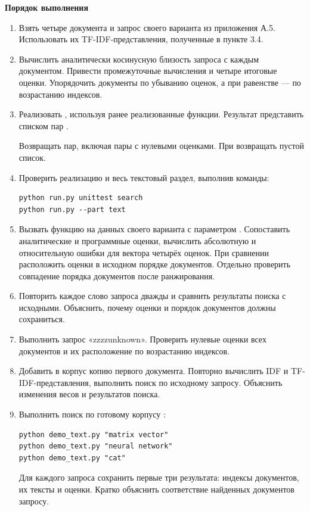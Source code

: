\documentclass[12pt,a4paper]{article}
\newcommand{\taskhead}[1]{\par\textbf{#1}\par}
\begin{document}
\taskhead{Порядок выполнения}
\begin{enumerate}
  \item Взять четыре документа и запрос своего варианта
  из приложения А.5. Использовать их TF-IDF-представления,
  полученные в пункте 3.4.
  \item Вычислить аналитически косинусную близость
  запроса с каждым документом. Привести промежуточные
  вычисления и четыре итоговые оценки.
  Упорядочить документы по убыванию оценок,
  а при равенстве --- по возрастанию индексов.
  \item Реализовать ,
  используя ранее реализованные функции.
  Результат представить списком пар .

  Возвращать  пар, включая пары
  с нулевыми оценками. При 
  возвращать пустой список.
  \item Проверить реализацию и весь текстовый раздел,
  выполнив команды:
  \begin{lstlisting}[style=commands]
python run.py unittest search
python run.py --part text\end{lstlisting}
  \item Вызвать функцию на данных своего варианта
  с параметром .
  Сопоставить аналитические и программные оценки,
  вычислить абсолютную и относительную ошибки
  для вектора четырёх оценок.
  При сравнении расположить оценки в исходном порядке
  документов. Отдельно проверить совпадение
  порядка документов после ранжирования.
  \item Повторить каждое слово запроса дважды
  и сравнить результаты поиска с исходными.
  Объяснить, почему оценки и порядок документов
  должны сохраниться.
  \item Выполнить запрос «zzzzunknown».
  Проверить нулевые оценки всех документов
  и их расположение по возрастанию индексов.
  \item Добавить в корпус копию первого документа.
  Повторно вычислить IDF и TF-IDF-представления,
  выполнить поиск по исходному запросу.
  Объяснить изменения весов и результатов поиска.
  \item Выполнить поиск по готовому корпусу
  :
  \begin{lstlisting}[style=commands]
python demo_text.py "matrix vector"
python demo_text.py "neural network"
python demo_text.py "cat"\end{lstlisting}
  Для каждого запроса сохранить первые три результата:
  индексы документов, их тексты и оценки.
  Кратко объяснить соответствие найденных документов запросу.
\end{enumerate}
\end{document}
